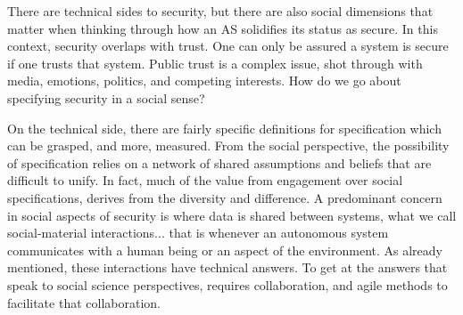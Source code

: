 \documentclass[sigconf]{acmart}
\begin{document}
%
%
%
%
%
%

There are technical sides to security, but there are also social dimensions that matter when thinking through how an AS solidifies its status as secure. In this context, security overlaps with trust. One can only be assured a system is secure if one trusts that system. Public trust is a complex issue, shot through with media, emotions, politics, and competing interests. How do we go about specifying security in a social sense? 

On the technical side, there are fairly specific definitions for specification which can be grasped, and more, measured. From the social perspective, the possibility of specification relies on a network of shared assumptions and beliefs that are difficult to unify. In fact, much of the value from engagement over social specifications, derives from the diversity and difference. A predominant concern in social aspects of security is where data is shared between systems, what we call social-material interactions... that is whenever an autonomous system communicates with a human being or an aspect of the environment. As already mentioned, these interactions have technical answers. To get at the answers that speak to social science perspectives, requires collaboration, and agile methods to facilitate that collaboration.
\end{document}
